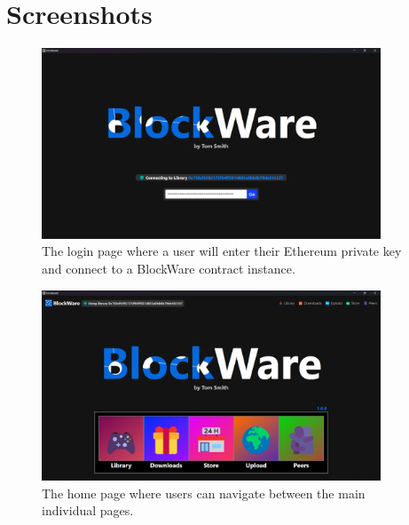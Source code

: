 \chapter{Screenshots}\label{app:screenshots}

\begin{figure}[!ht]
  \centering
  \includegraphics[width=0.9\textwidth]{assets/images/screenshots/login.png}
  \caption{The login page where a user will enter their Ethereum private key and connect to a BlockWare contract instance.}
\end{figure}

\begin{figure}[!ht]
  \centering
  \includegraphics[width=0.9\textwidth]{assets/images/screenshots/home.png}
  \caption{The home page where users can navigate between the main individual pages.}
\end{figure}

